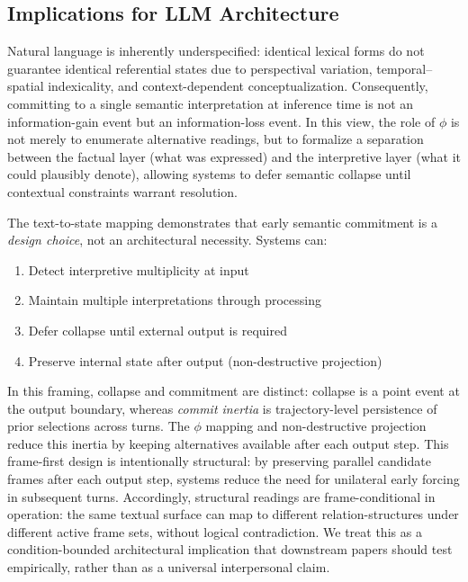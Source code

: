 \documentclass[11pt,a4paper]{article}
\begin{document}
\subsection{Implications for LLM Architecture}

Natural language is inherently underspecified: identical lexical forms do not 
guarantee identical referential states due to perspectival variation, 
temporal--spatial indexicality, and context-dependent conceptualization. 
Consequently, committing to a single semantic interpretation at inference time 
is not an information-gain event but an information-loss event. In this view, 
the role of $\phi$ is not merely to enumerate alternative readings, but to 
formalize a separation between the factual layer (what was expressed) and the 
interpretive layer (what it could plausibly denote), allowing systems to defer 
semantic collapse until contextual constraints warrant resolution.

The text-to-state mapping demonstrates that early semantic commitment is a 
\textit{design choice}, not an architectural necessity. Systems can:
\begin{enumerate}
    \item Detect interpretive multiplicity at input
    \item Maintain multiple interpretations through processing
    \item Defer collapse until external output is required
    \item Preserve internal state after output (non-destructive projection)
\end{enumerate}

In this framing, collapse and commitment are distinct: collapse is a point event at the output boundary, whereas \emph{commit inertia} is trajectory-level persistence of prior selections across turns. The $\phi$ mapping and non-destructive projection reduce this inertia by keeping alternatives available after each output step.
This frame-first design is intentionally structural: by preserving parallel candidate frames after each output step, systems reduce the need for unilateral early forcing in subsequent turns. Accordingly, structural readings are frame-conditional in operation: the same textual surface can map to different relation-structures under different active frame sets, without logical contradiction. We treat this as a condition-bounded architectural implication that downstream papers should test empirically, rather than as a universal interpersonal claim.
\end{document}
